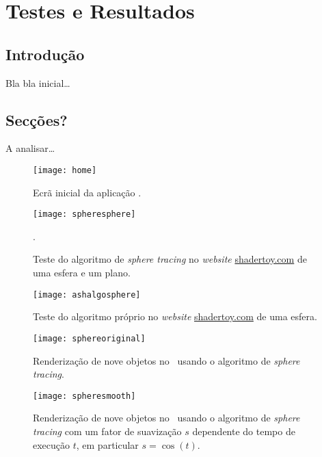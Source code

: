 \chapter{Testes e Resultados}
\label{ch::testes}

\section{Introdução}
\label{sec::testes:intro}

Bla bla inicial\ldots


\section{Secções?}
A analisar\ldots


\begin{figure}[!htbp]
	\centering
	\texttt{[image: home]}
	\caption[Ecrã inicial da aplicação]{Ecrã inicial da aplicação \theapp.}
	\label{fig::home}
\end{figure}

\begin{figure}[!htbp]
	\centering
	\texttt{[image: spheresphere]}
	\caption[Teste do algoritmo de \textit{sphere tracing}]{Teste do algoritmo de \textit{sphere tracing} no \textit{website} \url{shadertoy.com} de uma esfera e um plano.}.
	\label{fig::spheresphere}
\end{figure}

\begin{figure}[!htbp]
	\centering
	\texttt{[image: ashalgosphere]}
	\caption[Teste do algoritmo próprio]{Teste do algoritmo próprio no \textit{website} \url{shadertoy.com} de uma esfera.}
	\label{fig::ashalgosphere}
\end{figure}

\begin{figure}[!htbp]
	\centering
	\texttt{[image: sphereoriginal]}
	\caption[Nove objetos com \textit{sphere tracing} no \theapp]{Renderização de nove objetos no \theapp~usando o algoritmo de \textit{sphere tracing}.}
	\label{fig::sphereoriginal}
\end{figure}

\begin{figure}[!htbp]
	\centering
	\texttt{[image: spheresmooth]}
	\caption[Nove objetos com \textit{sphere tracing} e suavização no \theapp]{Renderização de nove objetos no \theapp~usando o algoritmo de \textit{sphere tracing} com um fator de suavização $s$ dependente do tempo de execução $t$, em particular $s = \cos(t)$.}
	\label{fig::spheresmooth}
\end{figure}

